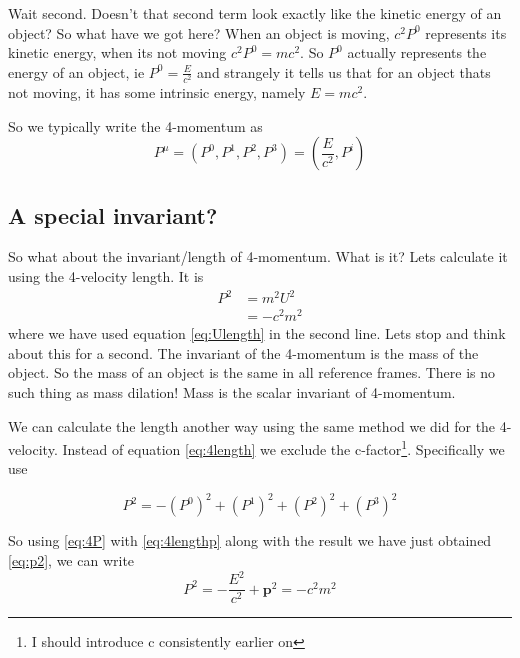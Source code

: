 Wait second. Doesn't that second term look exactly like the kinetic energy of an object? So what have we got here? When an object is moving, $c^2 P^0$ represents its kinetic energy, when its not moving $c^2 P^0 = m c^2$. So $P^0$ actually represents the energy of an object, ie $P^0 = \frac{E}{c^2}$ and strangely it tells us that for an object thats not moving, it has some intrinsic energy, namely $E = m c^2$. 

So we typically write the 4-momentum as
\begin{equation}
  P^\mu = (P^0, P^1, P^2, P^3) = (\frac{E}{c^2}, P^i)
  \label{eq:4P}
\end{equation}


\subsection{A special invariant?}

So what about the invariant/length of 4-momentum. What is it? Lets calculate it using the 4-velocity length.
It is
\begin{equation}
  \begin{aligned}
  P^2 &= m^2 U^2 \\
      &= -c^2 m^2
    \end{aligned}
    \label{eq:p2}
\end{equation}
where we have used equation \eqref{eq:Ulength} in the second line. Lets stop and think about this for a second. The invariant of the 4-momentum is the mass of the object. So the mass of an object is the same in all reference frames. There is no such thing as mass dilation! Mass is the scalar invariant of 4-momentum. 

We can calculate the length another way using the same method we did for the 4-velocity. Instead of equation \eqref{eq:4length} we exclude the c-factor\footnote{I should introduce c consistently earlier on}. Specifically we use

\begin{equation}
  P^2 = - (P^0)^2+ (P^1)^2 + (P^2)^2+(P^3)^2
  \label{eq:4lengthp}
\end{equation}

So using \eqref{eq:4P} with \eqref{eq:4lengthp} along with the result we have just obtained \eqref{eq:p2}, we can write
\begin{equation}
  P^2 = -\frac{E^2}{c^2} + \mathbf{p}^2 = - c^2 m^2 
\end{equation}

